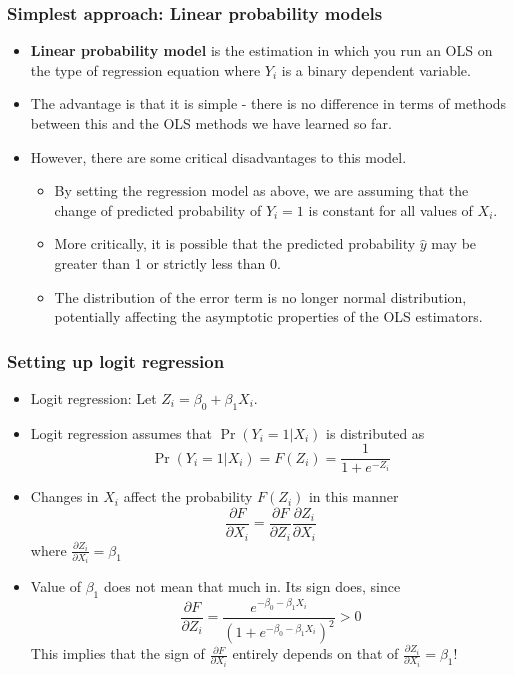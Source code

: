\documentclass[aspectratio=169]{beamer}
\begin{document}
\begin{frame}
\frametitle{Simplest approach: Linear probability models}
\begin{itemize}
\item \textbf{Linear probability model} is the estimation in which you run an OLS on the type of regression equation where $Y_i$ is a binary dependent variable.
\item The advantage is that it is simple - there is no difference in terms of methods between this and the OLS methods we have learned so far. 
\item However, there are some critical disadvantages to this model. 
\begin{itemize}
\item By setting the regression model as above, we are assuming that the change of predicted probability of $Y_i=1$ is constant for all values of $X_i$. 
\item More critically, it is possible that the predicted probability $\hat{y}$ may be greater than 1 or strictly less than 0.
\item The distribution of the error term is no longer normal distribution, potentially affecting the asymptotic properties of the OLS estimators.
\end{itemize}
\end{itemize}
\end{frame}

\begin{frame}
\frametitle{Setting up logit regression}
\begin{itemize}
\item Logit regression: Let $Z_i=\beta_0+\beta_1X_i$. 
\item Logit regression assumes that  $\Pr(Y_i=1|X_i)$  is distributed as
\[
\Pr(Y_i=1|X_i)=F(Z_i)=\frac{1}{1+e^{-Z_i}}
\]
\item Changes in $X_i$ affect the probability $F(Z_i)$ in this manner
\[
\frac{\partial F}{\partial X_i} = \frac{\partial F}{\partial Z_i}\frac{\partial Z_i}{\partial X_i}  
\]
where $\frac{\partial Z_i}{\partial X_i}  =\beta_1$
\item  Value of $\beta_1$ does not mean that much in. Its sign does, since
\[
 \frac{\partial F}{\partial Z_i}=\frac{e^{-\beta_0 -\beta_1X_i}}{(1+e^{-\beta_0 -\beta_1X_i})^2}>0
\]
This implies that the sign of $\frac{\partial F}{\partial X_i}$ entirely depends on that of $\frac{\partial Z_i}{\partial X_i} = \beta_1$!
\end{itemize}
\end{frame}
\end{document}
